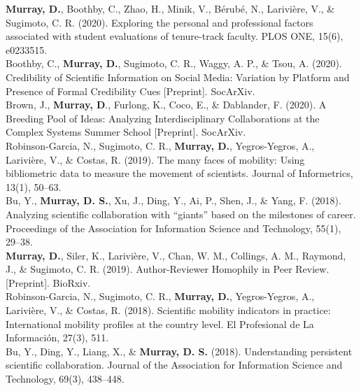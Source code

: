 \documentclass[10pt, a4paper]{article}
\newcommand{\years}[1]{\marginnote{\scriptsize #1}}
\begin{document}
\years{2020} \hangindent=0.7cm \textbf{Murray, D.}, Boothby, C., Zhao, H., Minik, V., Bérubé, N., Larivière, V., \& Sugimoto, C. R. (2020). Exploring the personal and professional factors associated with student evaluations of tenure-track faculty. PLOS ONE, 15(6), e0233515.  \\

\years{2020} \hangindent=0.7cm Boothby, C., \textbf{Murray, D.}, Sugimoto, C. R., Waggy, A. P., \& Tsou, A. (2020). Credibility of Scientific Information on Social Media: Variation by Platform and Presence of Formal Credibility Cues [Preprint]. SocArXiv. \\

\years{2020} \hangindent=0.7cm Brown, J., \textbf{Murray, D}., Furlong, K., Coco, E., \& Dablander, F. (2020). A Breeding Pool of Ideas: Analyzing Interdisciplinary Collaborations at the Complex Systems Summer School [Preprint]. SocArXiv. \\

\years{2019} \hangindent=0.7cm Robinson-Garcia, N., Sugimoto, C. R., \textbf{Murray, D.}, Yegros-Yegros, A., Larivière, V., \& Costas, R. (2019). The many faces of mobility: Using bibliometric data to measure the movement of scientists. Journal of Informetrics, 13(1), 50–63. \\

\years{2019} \hangindent=0.7cm Bu, Y., \textbf{Murray, D. S.}, Xu, J., Ding, Y., Ai, P., Shen, J., \& Yang, F. (2018). Analyzing scientific collaboration with “giants” based on the milestones of career. Proceedings of the Association for Information Science and Technology, 55(1), 29–38. \\

\years{2019} \textbf{Murray, D.}, Siler, K., Larivière, V., Chan, W. M., Collings, A. M., Raymond, J., \& Sugimoto, C. R. (2019). Author-Reviewer Homophily in Peer Review.[Preprint]. BioRxiv.  \\

\years{2018} \hangindent=0.7cm Robinson-Garcia, N., Sugimoto, C. R., \textbf{Murray, D.}, Yegros-Yegros, A., Larivière, V., \& Costas, R. (2018). Scientific mobility indicators in practice: International mobility profiles at the country level. El Profesional de La Información, 27(3), 511. \\

\years{2018} \hangindent=0.7cm Bu, Y., Ding, Y., Liang, X., \& \textbf{Murray, D. S. }(2018). Understanding persistent scientific collaboration. Journal of the Association for Information Science and Technology, 69(3), 438–448. \\
\end{document}
